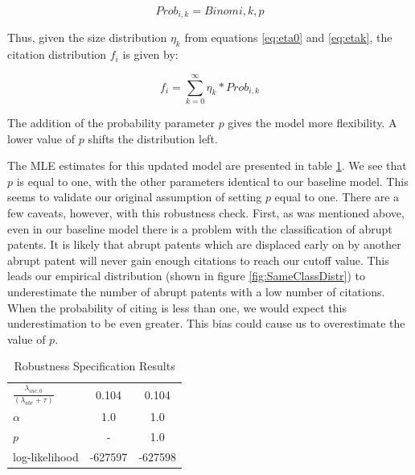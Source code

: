 \documentclass[letterpaper,12pt]{article}
\theoremstyle{definition}
\begin{document}
\begin{equation} \label{eq:prob}
Prob_{i, k} = Binom{i, k, p}
\end{equation}

Thus, given the size distribution $\eta_k$ from equations \ref{eq:eta0} and \ref{eq:etak}, the citation distribution $f_i$ is given by:

\begin{equation} \label{eq:cit_dist}
f_i = \displaystyle\sum_{k=0}^{\infty}\eta_k * Prob_{i, k}
\end{equation}

The addition of the probability parameter $p$ gives the model more flexibility. A lower value of $p$ shifts the distribution left.

The MLE estimates for this updated model are presented in table \ref{tab:Prob}. We see that $p$ is equal to one, with the other parameters identical to our baseline model. This seems to validate our original assumption of setting $p$ equal to one. There are a few caveats, however, with this robustness check. First, as was mentioned above, even in our baseline model there is a problem with the classification of abrupt patents. It is likely that abrupt patents which are displaced early on by another abrupt patent will never gain enough citations to reach our cutoff value. This leads our empirical distribution (shown in figure \ref{fig:SameClassDistr}) to underestimate the number of abrupt patents with a low number of citations. When the probability of citing is less than one, we would expect this underestimation to be even greater. This bias could cause us to overestimate the value of $p$.

\begin{table}[htbp]
	\caption{Robustness Specification Results}
	\centering\label{tab:Prob}
	\begin{tabular}{>{\small}l >{\small}c >{\small}c}
		\toprule
		    & \multicolumn{1}{c}{Baseline} & \multicolumn{1}{c}{Flexible}\\ 
		\midrule
		$\frac{\lambda_{inc, 0}}{(\lambda_{abr} + \tau)}$ & 0.104 & 0.104 \\
		$\alpha$ & 1.0 & 1.0\\
		$p$ & - & 1.0 \\
		log-likelihood & -627597 & -627598 \\
		\bottomrule
	\end{tabular}
\end{table}
\end{document}
